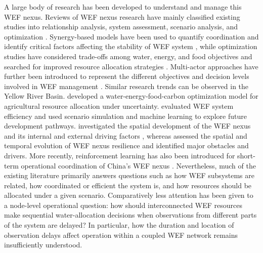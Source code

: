 \documentclass [a4paper,fleqn] {cas-dc}
\begin{document}
A large body of research has been developed to understand and manage this WEF nexus. Reviews of WEF nexus research have mainly classified existing studies into relationship analysis, system assessment, scenario analysis, and optimization \citep{albrecht2018,lyureview2026}. Synergy-based models have been used to quantify coordination and identify critical factors affecting the stability of WEF system \citep{Zhang2020WEFSynergy,han2024}, while optimization studies have considered trade-offs among water, energy, and food objectives and searched for improved resource allocation strategies \citep{DiMartino2023FEWNOptimizationReview,hong2024,memarzadeh2019,ocaranza2024,zuniga2025,dimartino2025}. Multi-actor approaches have further been introduced to represent the different objectives and decision levels involved in WEF management \citep{SaintBois2024WEFMultiActor}. Similar research trends can be observed in the Yellow River Basin. \cite{Ren2022YellowRiverWEFC} developed a water-energy-food-carbon optimization model for agricultural resource allocation under uncertainty. \cite{Zhang2024YellowRiverWEFEfficiency} evaluated WEF system efficiency and used scenario simulation and machine learning to explore future development pathways. \cite{Wang2025YellowRiverWEFDrivers} investigated the spatial development of the WEF nexus and its internal and external driving factors \citep{wu2025}, whereas \cite{Niu2026YellowRiverWEFResilience} assessed the spatial and temporal evolution of WEF nexus resilience and identified major obstacles and drivers. More recently, reinforcement learning has also been introduced for short-term operational coordination of China's WEF nexus \citep{lyu2026}. Nevertheless, much of the existing literature primarily answers questions such as how WEF subsystems are related, how coordinated or efficient the system is, and how resources should be allocated under a given scenario. Comparatively less attention has been given to a node-level operational question: how should interconnected WEF resources make sequential water-allocation decisions when observations from different parts of the system are delayed? In particular, how the duration and location of observation delays affect operation within a coupled WEF network remains insufficiently understood.
\end{document}
